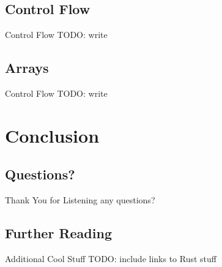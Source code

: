 \documentclass{beamer}
\begin{document}
	\subsection{Control Flow}
	\begin{frame}{Control Flow}
		TODO: write
	\end{frame}

	\subsection{Arrays}
	\begin{frame}{Control Flow}
		TODO: write
	\end{frame}

	\section{Conclusion}
	\subsection{Questions?}
	\begin{frame}{Thank You for Listening}
		any questions?
	\end{frame}

	\subsection{Further Reading}
	\begin{frame}{Additional Cool Stuff}
		TODO: include links to Rust stuff
	\end{frame}
\end{document}
